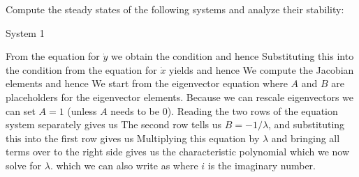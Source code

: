 Compute the steady states of the following systems and analyze their stability:

\subquestion 
System 1



\solution
From the equation for $\dot{y}$ we obtain the condition 
and hence 
Substituting this into the condition from the equation for $\dot{x}$ yields 
and hence 
We compute the Jacobian elements 
and hence 
We start from the eigenvector equation 
where $A$ and $B$ are placeholders for the eigenvector elements. Because we can rescale eigenvectors we can set $A=1$ (unless $A$ needs to be 0). Reading the two rows of the equation system separately gives us 
The second row tells us $B=-1/\lambda$, and substituting this into the first row gives us 
Multiplying this equation by $\lambda$ and bringing all terms over to the right side gives us the characteristic polynomial 
which we now solve for $\lambda$. 
which we can also write as 
where $i$ is the imaginary number.
